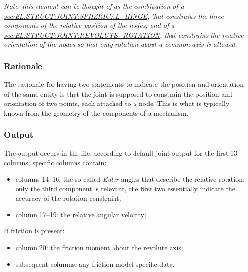 \emph{Note: this element can be thought of as the combination of a 
\hyperref{\kw{spherical hinge}}{\kw{spherical hinge} (see Section~}{)}{sec:EL:STRUCT:JOINT:SPHERICAL_HINGE},
that constrains the three components of the relative position
of the nodes, and of a
\hyperref{\kw{revolute rotation}}{\kw{revolute rotation} (see Section~}{)}{sec:EL:STRUCT:JOINT:REVOLUTE_ROTATION},
that constrains the relative orientation of the nodes so that only rotation
about a common axis is allowed.}

\subsubsection{Rationale}
The rationale for having two statements to indicate the position
and orientation of the same entity is that the joint is supposed
to constrain the position and orientation of two points,
each attached to a node.
This is what is typically known from the geometry of the components
of a mechanism.

\subsubsection{Output}
The output occurs in the  file, according to default joint output
for the first 13 columns; specific columns contain:
\begin{itemize}
\item columns 14--16: the so-called \emph{Euler} angles that describe 
	the relative rotation; only the third component is relevant,
	the first two essentially indicate the accuracy of the rotation 
	constraint;
\item column 17--19: the relative angular velocity;
\end{itemize}
If friction is present:
\begin{itemize}
\item column 20: the friction moment about the revolute axis;
\item subsequent columns: any friction model specific data.
\end{itemize}


